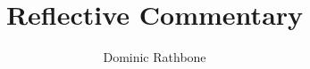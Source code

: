 \documentclass[]{report}
\title{Reflective Commentary}
\author{Dominic Rathbone}
\begin{document}
\maketitle

\begin{abstract}
\end{abstract}
\end{document}
